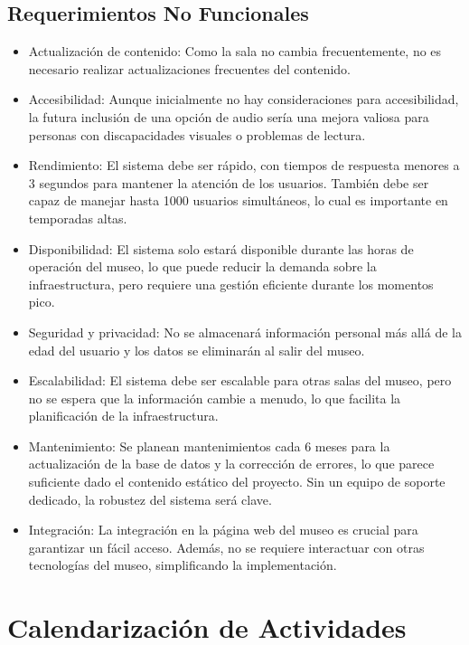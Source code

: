 \documentclass{report}
\begin{document}
    \subsection*{Requerimientos No Funcionales}
    \begin{itemize}
        \item Actualización de contenido: Como la sala no cambia frecuentemente, no es necesario realizar actualizaciones frecuentes del contenido.
        \item Accesibilidad: Aunque inicialmente no hay consideraciones para accesibilidad, la futura inclusión de una opción de audio sería una mejora valiosa para personas con discapacidades visuales o problemas de lectura.
        \item Rendimiento: El sistema debe ser rápido, con tiempos de respuesta menores a 3 segundos para mantener la atención de los usuarios. También debe ser capaz de manejar hasta 1000 usuarios simultáneos, lo cual es importante en temporadas altas.
        \item Disponibilidad: El sistema solo estará disponible durante las horas de operación del museo, lo que puede reducir la demanda sobre la infraestructura, pero requiere una gestión eficiente durante los momentos pico.
        \item Seguridad y privacidad: No se almacenará información personal más allá de la edad del usuario y los datos se eliminarán al salir del museo.
        \item Escalabilidad: El sistema debe ser escalable para otras salas del museo, pero no se espera que la información cambie a menudo, lo que facilita la planificación de la infraestructura.
        \item Mantenimiento: Se planean mantenimientos cada 6 meses para la actualización de la base de datos y la corrección de errores, lo que parece suficiente dado el contenido estático del proyecto. Sin un equipo de soporte dedicado, la robustez del sistema será clave.
        \item Integración: La integración en la página web del museo es crucial para garantizar un fácil acceso. Además, no se requiere interactuar con otras tecnologías del museo, simplificando la implementación.
    \end{itemize}

    \newpage

    \section{Calendarización de Actividades}
\end{document}
